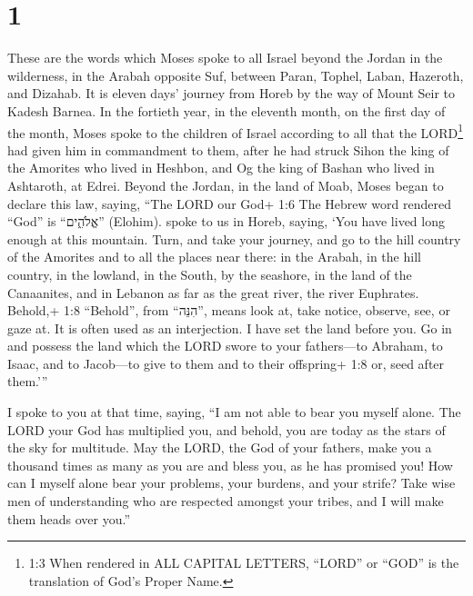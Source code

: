 \hypertarget{section}{%
\section{1}\label{section}}

 These are the words which Moses spoke to all Israel beyond
the Jordan in the wilderness, in the Arabah opposite Suf, between Paran,
Tophel, Laban, Hazeroth, and Dizahab.  It is eleven days'
journey from Horeb by the way of Mount Seir to Kadesh Barnea.
 In the fortieth year, in the eleventh month, on the first
day of the month, Moses spoke to the children of Israel according to all
that the LORD\footnote{1:3 When rendered in ALL CAPITAL LETTERS,
  ``LORD'' or ``GOD'' is the translation of God's Proper Name.} had
given him in commandment to them,  after he had struck Sihon
the king of the Amorites who lived in Heshbon, and Og the king of Bashan
who lived in Ashtaroth, at Edrei.  Beyond the Jordan, in the
land of Moab, Moses began to declare this law, saying, 
``The LORD our God+ 1:6 The Hebrew word rendered ``God'' is
``אֱלֹהִ֑ים'' (Elohim). spoke to us in Horeb, saying, `You have lived
long enough at this mountain.  Turn, and take your journey,
and go to the hill country of the Amorites and to all the places near
there: in the Arabah, in the hill country, in the lowland, in the South,
by the seashore, in the land of the Canaanites, and in Lebanon as far as
the great river, the river Euphrates.  Behold,+ 1:8
``Behold'', from ``הִנֵּה'', means look at, take notice, observe, see,
or gaze at. It is often used as an interjection. I have set the land
before you. Go in and possess the land which the LORD swore to your
fathers---to Abraham, to Isaac, and to Jacob---to give to them and to
their offspring+ 1:8 or, seed after them.'''

 I spoke to you at that time, saying, ``I am not able to
bear you myself alone.  The LORD your God has multiplied
you, and behold, you are today as the stars of the sky for multitude.
 May the LORD, the God of your fathers, make you a thousand
times as many as you are and bless you, as he has promised you!
 How can I myself alone bear your problems, your burdens,
and your strife?  Take wise men of understanding who are
respected amongst your tribes, and I will make them heads over you.''

